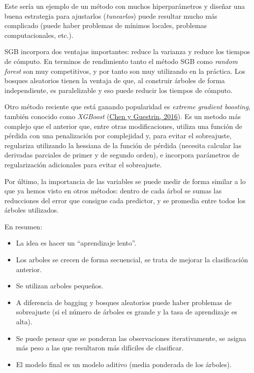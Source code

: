 \documentclass[
]{book}
\theoremstyle{break}
\theoremstyle{nonumberplain}
\begin{document}
Este sería un ejemplo de un método con muchos hiperparámetros y diseñar una buena estrategia para ajustarlos (\emph{tunearlos}) puede resultar mucho más complicado (puede haber problemas de mínimos locales, problemas computacionales, etc.).

SGB incorpora dos ventajas importantes: reduce la varianza y reduce los tiempos de cómputo.
En terminos de rendimiento tanto el método SGB como \emph{random forest} son muy competitivos, y por tanto son muy utilizando en la práctica.
Los bosques aleatorios tienen la ventaja de que, al construir árboles de forma independiente, es paralelizable y eso puede reducir los tiempos de cómputo.

Otro método reciente que está ganando popularidad es \emph{extreme gradient boosting}, también conocido como \emph{XGBoost} (\protect\hyperlink{ref-chen2016xgboost}{Chen y Guestrin, 2016}).
Es un metodo más complejo que el anterior que, entre otras modificaciones, utiliza una función de pérdida con una penalización por complejidad y, para evitar el sobreajuste, regulariza utilizando la hessiana de la función de pérdida (necesita calcular las derivadas parciales de primer y de segundo orden), e incorpora parámetros de regularización adicionales para evitar el sobreajuste.

Por último, la importancia de las variables se puede medir de forma similar a lo que ya hemos visto en otros métodos: dentro de cada árbol se sumas las reducciones del error que consigue cada predictor, y se promedia entre todos los árboles utilizados.

En resumen:

\begin{itemize}
\item
  La idea es hacer un ``aprendizaje lento''.
\item
  Los arboles se crecen de forma secuencial, se trata de mejorar la
  clasificación anterior.
\item
  Se utilizan arboles pequeños.
\item
  A diferencia de bagging y bosques aleatorios puede haber problemas de sobreajuste (si el número de árboles es grande y la tasa de aprendizaje es alta).
\item
  Se puede pensar que se ponderan las observaciones iterativamente, se
  asigna más peso a las que resultaron más difíciles de clasificar.
\item
  El modelo final es un modelo aditivo (media ponderada de los
  árboles).
\end{itemize}
\end{document}
